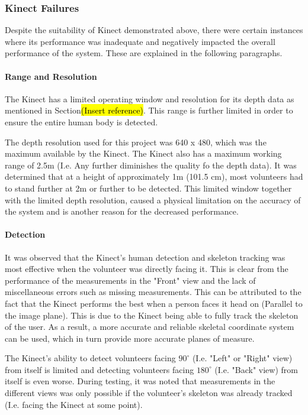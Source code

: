 \subsubsection{Kinect Failures}
Despite the suitability of Kinect demonstrated above, there were certain instances where its performance was inadequate and negatively impacted the overall performance of the system. These are explained in the following paragraphs. 

\paragraph{Range and Resolution}
The Kinect has a limited operating window and resolution for its depth data as mentioned in Section\hl{(Insert reference)}. This range is further limited in order to ensure the entire human body is detected. 

The depth resolution used for this project was 640 x 480, which was the maximum available by the Kinect. The Kinect also has a maximum working range of 2.5m (I.e. Any further diminishes the quality fo the depth data). It was determined that at a height of approximately 1m (101.5 cm), most volunteers had to stand further at 2m or further to be detected. This limited window together with the limited depth resolution, caused a physical limitation on the accuracy of the system and is another reason for the decreased performance. 

\paragraph{Detection}
It was observed that the Kinect's human detection and skeleton tracking was most effective when the volunteer was directly facing it. This is clear from the performance of the measurements in the "Front" view and the lack of miscellaneous errors such as missing measurements. This can be attributed to the fact that the Kinect performs the best when a person faces it head on (Parallel to the image plane). This is due to the Kinect being able to fully track the skeleton of the user. As a result, a more accurate and reliable skeletal coordinate system can be used, which in turn provide more accurate planes of measure. 

The Kinect's ability to detect volunteers facing $90^{\circ}$ (I.e. "Left" or "Right" view) from itself is limited and detecting volunteers facing $180^{\circ}$ (I.e. "Back" view) from itself is even worse. During testing, it was noted that measurements in the different views was only possible if the volunteer's skeleton was already tracked (I.e. facing the Kinect at some point). 

